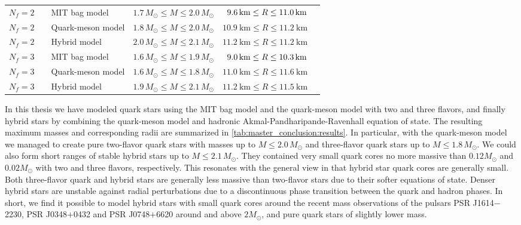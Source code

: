 \begin{table}[b!]
{\begin{tabular}{ c l l c c c }
	$N_f=2$ & \Cref{chap:mit} & MIT bag model & $1.7 \, M_\odot \leq M \leq 2.0 \, M_\odot$ & $\hphantom{1}\SI{9.6}{\kilo\meter} \leq R \leq \SI{11.0}{\kilo\meter}$ \\
	$N_f=2$ & \Cref{chap:lsm2f} & Quark-meson model & $1.8 \, M_\odot \leq M \leq 2.0 \, M_\odot$ & $\SI{10.9}{\kilo\meter} \leq R \leq \SI{11.2}{\kilo\meter}$ \\
	$N_f=2$ & \Cref{chap:hybrid} & Hybrid model & $2.0 \, M_\odot \leq M \leq 2.1 \, M_\odot$ & $\SI{11.2}{\kilo\meter} \leq R \leq \SI{11.2}{\kilo\meter}$ \\
	\midrule
	$N_f=3$ & \Cref{chap:mit} & MIT bag model & $1.6 \, M_\odot \leq M \leq 1.9 \, M_\odot$ & $\hphantom{1}\SI{9.0}{\kilo\meter} \leq R \leq \SI{10.3}{\kilo\meter}$ \\
	$N_f=3$ & \Cref{chap:lsm3f} & Quark-meson model & $1.6 \, M_\odot \leq M \leq 1.8 \, M_\odot$ & $\SI{11.0}{\kilo\meter} \leq R \leq \SI{11.6}{\kilo\meter}$ \\
	$N_f=3$ & \Cref{chap:hybrid} & Hybrid model & $1.9 \, M_\odot \leq M \leq 2.1 \, M_\odot$ & $\SI{11.2}{\kilo\meter} \leq R \leq \SI{11.5}{\kilo\meter}$ \\
	\bottomrule
\end{tabular}}
\end{table}

In this thesis we have modeled quark stars using the MIT bag model and the quark-meson model with two and three flavors,
and finally hybrid stars by combining the quark-meson model and hadronic Akmal-Pandharipande-Ravenhall equation of state.
The resulting maximum masses and corresponding radii are summarized in \cref{tab:master_conclusion:results}.
In particular, with the quark-meson model we managed to create pure two-flavor quark stars with masses up to $M \leq 2.0 \, M_\odot$ and three-flavor quark stars up to $M \leq 1.8 \, M_\odot$.
We could also form short ranges of stable hybrid stars up to $M \leq 2.1 \, M_\odot$.
They contained very small quark cores no more massive than $0.12 M_\odot$ and $0.02 M_\odot$ with two and three flavors, respectively.
This resonates with the general view in \cite{ref:quark_star_review} that hybrid star quark cores are generally small.
Both three-flavor quark and hybrid stars are generally less massive than two-flavor stars due to their softer equations of state.
Denser hybrid stars are unstable against radial perturbations due to a discontinuous phase transition between the quark and hadron phases.
In short, we find it possible to model hybrid stars with small quark cores around the recent mass observations of the pulsars PSR J1614$-$2230, PSR J0348$+$0432 and PSR J0748$+$6620 around and above $2 M_\odot$,
and pure quark stars of slightly lower mass.

